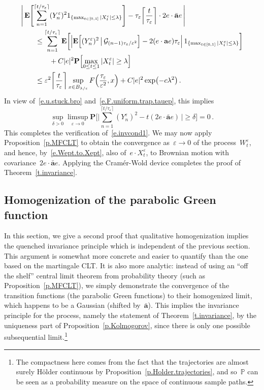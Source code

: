 \documentclass[11pt]{article} %
\numberwithin{equation}{section}
\theoremstyle{definition}
\newcommand{\eps}{\varepsilon}
\newcommand{\ep}{\eps}
\renewcommand{\a}{\mathbf{a}}
\newcommand{\ahom}{\bar{\a}}
\renewcommand{\P}{\mathbb{P}}
\newcommand{\indc}{1}
\begin{document}
\begin{align}
\label{e.Yepn2.main}
\lefteqn{
\Biggl|
\,
\mathbf{E} 
\Biggl[ 
\sum_{n=1}^{\lceil t/\tau_\ep \rceil} 
(Y^\ep_n)^2\indc_{\{ \max_{ t\in[0,1]} |X^\ep_{t} | \leq \lambda\}}
\Biggr]
-
\tau_\ep \biggl\lceil \frac{t}{\tau_\ep} \biggr\rceil  \cdot 2 e\cdot \ahom e
\,
\Biggr|
} 
\qquad &
\notag \\ &
\leq
\sum_{n=1}^{\lceil t/\tau_\ep \rceil}
\mathbf{E} \biggl[
\Bigl| 
\mathbf{E} \Bigl[ (Y_{n}^\ep )^2 \, \big\vert \, \mathcal{G}_{(n-1)\tau_\ep/\ep^2} \Bigr] 
- 2 (e\cdot \a e) \tau_\ep
\Bigr|
\, \indc_{\{ \max_{  t\in[0,1]} |X^\ep_{t} | \leq \lambda \}} 
\biggr]
\notag \\ & \qquad 
+
C|e|^2 \mathbf{P} \Bigl[ \max_{ 0 \leq t \leq 1} |X^\ep_{t} | \geq \lambda \Bigr]
\notag \\ & 
\leq
\ep^2 \biggl\lceil \frac{t}{\tau_\ep} \biggr\rceil 
\sup_{ x \in B_{\lambda /\ep}}
F \Bigl( \frac {\tau_\ep}{\ep^2}, x \Bigr)
+
C|e|^2 \exp \bigl(-c\lambda^2\bigr)
\,.
\end{align}
In view of~\eqref{e.u.stuck.bro} and~\eqref{e.F.uniform.trap.tauep}, 
this implies 
\begin{equation*}
\sup_{\delta>0}
\limsup_{\ep \to 0} 
\mathbf{P} 
\Biggl[ 
\biggl| 
\sum_{n=1}^{\lceil t/\tau_\ep \rceil} 
(Y^\ep_n)^2 
-
t (2 e\cdot \ahom e) 
\,
\biggr|
\geq \delta 
\Biggr]
= 0\,.
\end{equation*}
This completes the verification of~\eqref{e.invcond1}. 
We may now apply Proposition~\ref{p.MFCLT} to obtain the convergence as~$\ep\to0$ of the process~$W^\ep_t$, and hence, by~\eqref{e.Wept.to.Xept}, also of~$e\cdot X^\ep_t$, to Brownian motion with covariance~$2e\cdot \ahom e$. Applying the Cram\'er-Wold device completes the proof of Theorem~\ref{t.invariance}. 



\subsection{Homogenization of the parabolic Green function}
\label{ss.Green}

In this section, we give a second proof that qualitative homogenization implies the quenched invariance principle which is independent of the previous section. This argument is somewhat more concrete and easier to quantify than the one based on the martingale CLT. It is also more analytic: instead of using an ``off the shelf'' central limit theorem from probability theory (such as Proposition~\ref{p.MFCLT}), we simply demonstrate the convergence of the transition functions (the parabolic Green functions) to their homogenized limit, which happens to be a Gaussian (shifted by~$\ahom$). This implies the invariance principle for the process, namely the statement of Theorem~\ref{t.invariance}, by the uniqueness part of Proposition~\ref{p.Kolmogorov}, since there is only one possible subsequential limit.\footnote{The compactness here comes from the fact that the trajectories are almost surely H\"older continuous by Proposition~\ref{p.Holder.trajectories}, and so~$\P$ can be seen as a probability measure on the space of continuous sample paths.}
\end{document}
